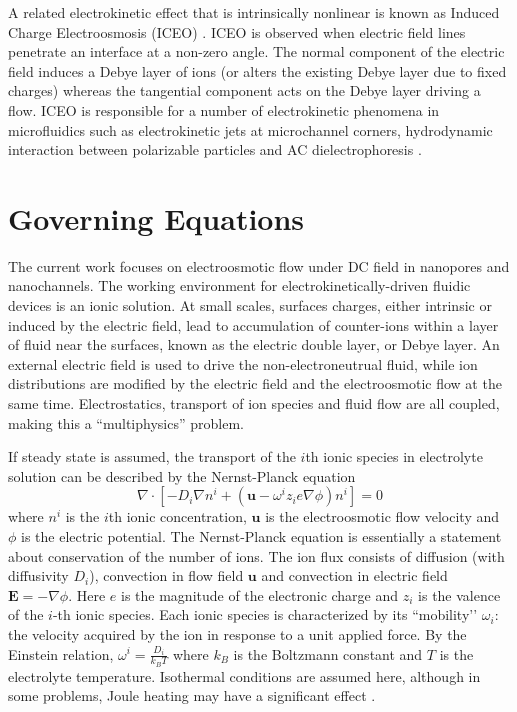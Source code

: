 A related electrokinetic effect that is intrinsically nonlinear is known as Induced Charge Electroosmosis (ICEO) \cite{murtsovkin96,Squires2004}. ICEO is observed when electric field lines penetrate an interface at a non-zero angle. The normal component of the electric field induces a Debye layer of ions (or alters the existing Debye layer due to 
fixed charges) whereas the tangential component acts on the Debye layer driving a flow. 
ICEO is responsible for a number of electrokinetic phenomena in microfluidics such as electrokinetic jets at microchannel corners, hydrodynamic interaction between polarizable particles and AC dielectrophoresis \cite{bazant2004induced,levitan2005experimental,basuray2007induced,bazant2009towards,schnitzer2012induced,schnitzer2014strong}. 


\section{Governing Equations}
The current work focuses on electroosmotic flow under DC field in nanopores and nanochannels.  The working environment for electrokinetically-driven fluidic devices is an ionic solution. At small scales, surfaces charges, either intrinsic or induced by the electric field, lead to accumulation of counter-ions within a layer of fluid near the surfaces, known as the electric double layer, or Debye layer. An external electric field is used to drive the non-electroneutrual fluid, while ion distributions are modified by the electric field and the electroosmotic flow at the same time. Electrostatics, transport of ion species and fluid flow are all coupled, making this a ``multiphysics'' problem.

If steady state is assumed, the transport of the $i$th ionic species in electrolyte solution can be described by the Nernst-Planck equation \cite{landau1981course}
\begin{equation}
\nabla \cdot \left[ -D_i \nabla n^i  + \left(\mathbf{u} - \omega^i z_i e\nabla\phi \right)n^i  \right] = 0
\label{eq:nernst-planck}
\end{equation}
where $n^i$ is the $i$th ionic concentration, $\mathbf{u}$ is the electroosmotic flow velocity and $\phi$ is the electric potential. The Nernst-Planck equation is essentially a statement about  conservation of the number of ions. The ion flux consists of diffusion (with diffusivity $D_i$), convection in flow field $\mathbf{u}$ and convection in electric field $\mathbf{E} = -\nabla \phi$. Here $e$ is the magnitude of the electronic charge and $z_i$ is the valence of the $i$-th ionic species.  Each ionic species is characterized by its ``mobility’’ $\omega_i$: the velocity acquired by the ion in response to a unit applied force.   By the Einstein relation, $\omega^i=\frac{D_i}{k_B T}$ where $k_B$ is the Boltzmann constant and $T$ is the electrolyte temperature. Isothermal conditions are assumed here, although in some problems, Joule heating may have a significant effect \cite{sridharan2011joule}. 

